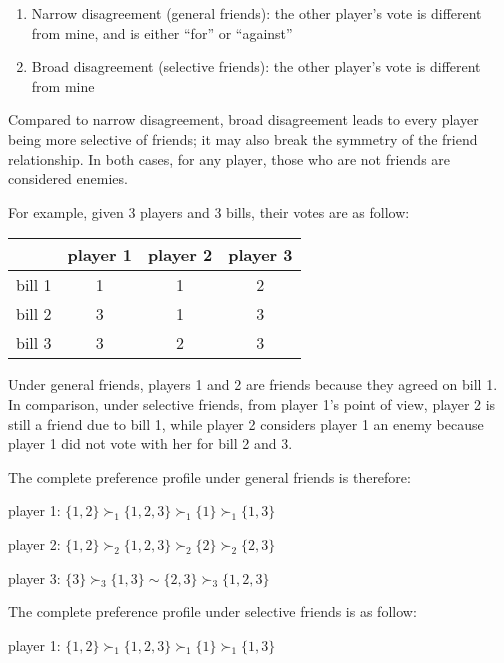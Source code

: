 \begin{enumerate}
  \item Narrow disagreement (general friends): the other player's vote is different from mine, and is either ``for'' or ``against''
  \item Broad disagreement (selective friends): the other player's vote is different from mine
\end{enumerate}

Compared to narrow disagreement, broad disagreement leads to every player being
more selective of friends; it may also break the symmetry of the friend
relationship.
In both cases, for any player, those who are not friends are considered enemies.

\begin{example}
\label{example:votes_friends}
  For example, given 3 players and 3 bills, their votes are as follow:

  \begin{table}[h!]
  \centering
  \begin{tabular}{|c|c|c|c|}
  \hline
         & player 1 & player 2 & player 3 \\ \hline
  bill 1 & 1 & 1 & 2 \\
  bill 2 & 3 & 1 & 3 \\
  bill 3 & 3 & 2 & 3 \\
  \hline
  \end{tabular}
  \end{table}

\end{example}

Under general friends, players 1 and 2 are friends because they agreed on bill 1.
In comparison, under selective friends, from player 1's point of view, player 2
is still a friend due to bill 1, while player 2 considers player 1 an enemy
because player 1 did not vote with her for bill 2 and 3.

The complete preference profile under general friends is therefore:

player 1: $\{1, 2\} \succ_1 \{1, 2, 3\} \succ_1 \{1\} \succ_1 \{1, 3\} $

player 2: $\{1, 2\} \succ_2 \{1, 2, 3\} \succ_2 \{2\} \succ_2 \{2, 3\}$

player 3: $\{3\} \succ_3 \{1, 3\} \sim \{2, 3\} \succ_3 \{1, 2, 3\}$

The complete preference profile under selective friends is as follow:

player 1: $\{1, 2\} \succ_1 \{1, 2, 3\} \succ_1 \{1\} \succ_1 \{1, 3\} $

